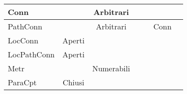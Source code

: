 \documentclass[a4paper,NoNotes,GeneralMath]{stdmdoc}
\newcommand{\Arbitrari}{Arbitrari}
\newcommand{\Numerabili}{Numerabili}
\newcommand{\rd}[1]{{\color{red} #1 }}
\begin{document}
\begin{tabular}{lcccccc}
	Conn            & \rd\crossmark    & \rd\Arbitrari  &                 & \checkmark             &               \\ \hline
	PathConn        & \rd\crossmark    & \rd\Arbitrari  &                 & \checkmark             & Conn          \\ \hline
	LocConn         & \rd{Aperti}      &                &                 &                        &               \\ \hline
	LocPathConn     & \rd{Aperti}      &                &                 &                        &               \\ \hline

	Metr            & \checkmark       & \rd\Numerabili &                 &                        &               \\ \hline
	ParaCpt         & \rd{Chiusi}      & \rd\crossmark  &                 &                        &               \\ \hline
	\end{tabular} \vskip 1.5cm
\end{document}
